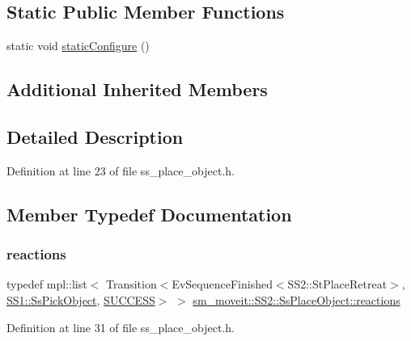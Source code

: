 \subsection*{Static Public Member Functions}
\begin{DoxyCompactItemize}
\item 
static void \hyperlink{structsm__moveit_1_1SS2_1_1SsPlaceObject_a3b82d494fc8511de679c4d1dc8bd71e2}{static\+Configure} ()
\end{DoxyCompactItemize}
\subsection*{Additional Inherited Members}


\subsection{Detailed Description}


Definition at line 23 of file ss\+\_\+place\+\_\+object.\+h.



\subsection{Member Typedef Documentation}
\mbox{\label{structsm__moveit_1_1SS2_1_1SsPlaceObject_acc874c137e9181f6575d964273e5a542}} 
\subsubsection{\texorpdfstring{reactions}{reactions}}
{\footnotesize\ttfamily typedef mpl\+::list$<$ Transition$<$Ev\+Sequence\+Finished$<$S\+S2\+::\+St\+Place\+Retreat$>$, \hyperlink{structsm__moveit_1_1SS1_1_1SsPickObject}{S\+S1\+::\+Ss\+Pick\+Object}, \hyperlink{classSUCCESS}{S\+U\+C\+C\+E\+SS}$>$ $>$ \hyperlink{structsm__moveit_1_1SS2_1_1SsPlaceObject_acc874c137e9181f6575d964273e5a542}{sm\+\_\+moveit\+::\+S\+S2\+::\+Ss\+Place\+Object\+::reactions}}



Definition at line 31 of file ss\+\_\+place\+\_\+object.\+h.



